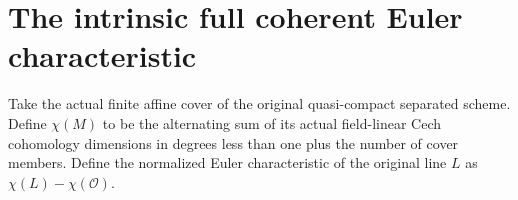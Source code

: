 \section{The intrinsic full coherent Euler characteristic}

\begin{definition}
\label{def:fc-scheme-coherent-euler-characteristic}
\leanok
{}
Take the actual finite affine cover of the original quasi-compact
separated scheme. Define $\chi(M)$ to be the alternating sum of its
actual field-linear Cech cohomology dimensions in degrees less than
one plus the number of cover members. Define the normalized Euler
characteristic of the original line $L$ as $\chi(L)-\chi(\mathcal O)$.
\end{definition}

